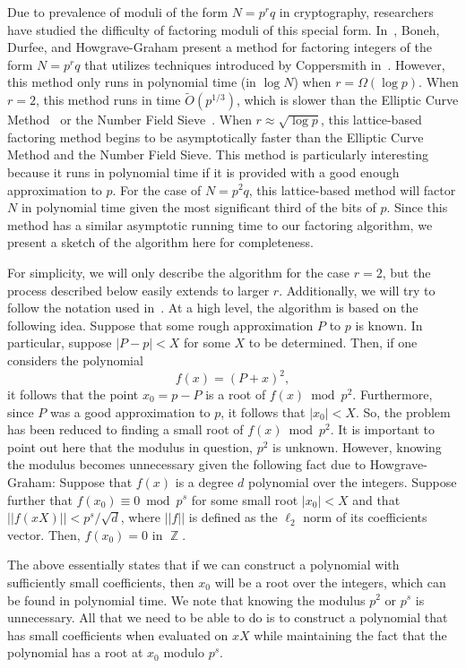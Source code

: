\documentclass[letterpaper,twocolumn,10pt]{article}
\DeclareMathOperator{\Z}{\mathbb{Z}}
\begin{document}
Due to prevalence of moduli of the form $N = p^r q$ in cryptography, researchers have studied the difficulty of factoring moduli of this special form. In~\cite{dan}, Boneh, Durfee, and Howgrave-Graham present a method for factoring integers of the form $N = p^r q$ that utilizes techniques introduced by Coppersmith in~\cite{Coppersmith1997}. However, this method only runs in polynomial time (in $\log N$) when $r = \Omega(\log p)$. When $r = 2$, this method runs in time $\tilde{O}(p^{1/3})$, which is slower than the Elliptic Curve Method~\cite{Lenstra} or the Number Field Sieve~\cite{pomerance}. When $r \approx \sqrt{\log p}$, this lattice-based factoring method begins to be asymptotically faster than the Elliptic Curve Method and the Number Field Sieve. This method is particularly interesting because it runs in polynomial time if it is provided with a good enough approximation to $p$. For the case of $N = p^2 q$, this lattice-based method will factor $N$ in polynomial time given the most significant third of the bits of $p$. Since this method has a similar asymptotic running time to our factoring algorithm, we present a sketch of the algorithm here for completeness.

For simplicity, we will only describe the algorithm for the case $r = 2$, but the process described below easily extends to larger $r$. Additionally, we will try to follow the notation used in~\cite{dan}. At a high level, the algorithm is based on the following idea. Suppose that some rough approximation $P$ to $p$ is known. In particular, suppose $|P - p| < X$ for some $X$ to be determined. Then, if one considers the polynomial
\[
f(x) = (P + x)^2,
\]  
it follows that the point $x_0 = p - P$ is a root of $f(x) \bmod p^2$. Furthermore, since $P$ was a good approximation to $p$, it follows that $|x_0| < X$. So, the problem has been reduced to finding a small root of $f(x) \bmod p^2$. It is important to point out here that the modulus in question, $p^2$ is unknown. However, knowing the modulus becomes unnecessary given the following fact due to Howgrave-Graham: Suppose that $f(x)$ is a degree $d$ polynomial over the integers. Suppose further that $f(x_0) \equiv 0 \bmod p^s$ for some small root $|x_0| < X$ and that $||f(xX)|| < p^s/\sqrt{d}$, where $||f||$ is defined as the $\ell_2$ norm of its coefficients vector. Then, $f(x_0) = 0$ in $\Z$. 

The above essentially states that if we can construct a polynomial with sufficiently small coefficients, then $x_0$ will be a root over the integers, which can be found in polynomial time. We note that knowing the modulus $p^2$ or $p^s$ is unnecessary. All that we need to be able to do is to construct a polynomial that has small coefficients when evaluated on $xX$ while maintaining the fact that the polynomial has a root at $x_0$ modulo $p^s$. 
\end{document}
